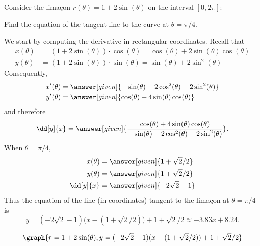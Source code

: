 \documentclass{ximera}
\begin{document}
\begin{example}
  Consider the lima\c{c}on $r(\theta) =1+2\sin(\theta)$ on the interval $[0,2\pi]$:
  \begin{image}
  \end{image}
  Find the equation of the tangent line to the curve at $\theta=\pi/4$.
  \begin{explanation}
    We start by computing the derivative in rectangular coordinates. Recall that
    \begin{align*}
      x(\theta) &= \left(1+2\sin(\theta)\right)\cdot \cos(\theta) = \cos(\theta)+2\sin(\theta)\cos(\theta)\\
      y(\theta) &= \left(1+2\sin(\theta)\right)\cdot \sin(\theta) = \sin(\theta)+2\sin^2(\theta)
    \end{align*}
    Consequently,
    \begin{align*}
      x'(\theta) &= \answer[given]{-\sin(\theta) + 2\cos^2(\theta)-2\sin^2(\theta)} \\
      y'(\theta) &= \answer[given]{\cos(\theta) + 4\sin(\theta)\cos(\theta)}
    \end{align*}
    and therefore
    \[
    \dd[y]{x} = \answer[given]{\frac{\cos(\theta) + 4\sin(\theta)\cos(\theta)}{-\sin(\theta) + 2\cos^2(\theta)-2\sin^2(\theta)}}.
    \]
    When $\theta=\pi/4$,
    \begin{align*}
      x(\theta) &= \answer[given]{1+\sqrt{2}/2}\\
      y(\theta) &=\answer[given]{1+\sqrt{2}/2}\\
    \dd[y]{x} &=\answer[given]{-2\sqrt{2}-1}
    \end{align*}
     Thus the equation of the line (in  coordinates) tangent to the lima\c{c}on at $\theta=\pi/4$ is
     \[
     y=(-2\sqrt{2}-1)\big(x-(1+\sqrt{2}/2)\big)+1+\sqrt{2}/2 \approx  -3.83 x+8.24.
     \]
    \begin{prompt}
      \[
      \graph{r=1+2\sin(\theta), y=(-2\sqrt{2}-1)(x-(1+\sqrt{2}/2))+1+\sqrt{2}/2}
      \]
    \end{prompt}
  \end{explanation}
\end{example}
\end{document}
